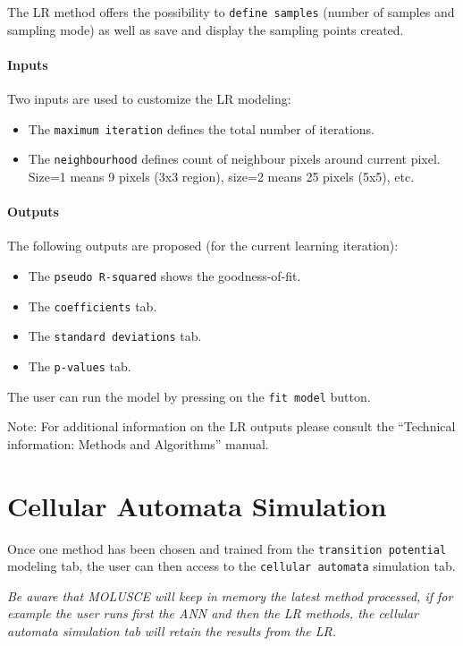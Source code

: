 \documentclass{report}
\begin{document}
The LR method offers the possibility to \verb+define samples+ (number of samples and sampling mode) as
well as save and display the sampling points created.

\paragraph{Inputs} Two inputs are used to customize the LR modeling:
\begin{itemize}
  \item The \verb+maximum iteration+ defines the total number of iterations.
  \item The \verb+neighbourhood+ defines count of neighbour pixels around current pixel. Size=1 means 9
pixels (3x3 region), size=2 means 25 pixels (5x5), etc.
\end{itemize}

\paragraph{Outputs} 

The following outputs are proposed (for the current learning iteration):

\begin{itemize}
  \item The \verb+pseudo R-squared+ shows the goodness-of-fit.
  \item The \verb+coefficients+ tab.
  \item The \verb+standard deviations+ tab.
  \item The \verb+p-values+ tab.
\end{itemize}

The user can run the model by pressing on the \verb+fit model+ button.

Note: For additional information on the LR outputs please consult the “Technical information:
Methods and Algorithms” manual.


\section{Cellular Automata Simulation}

Once one method has been chosen and trained from the \verb+transition potential+ modeling tab, 
the user can then access to the \verb+cellular automata+ simulation tab.

\emph{Be aware that MOLUSCE will keep in memory the
latest method processed, if for example the user runs first the ANN and then the LR methods, the
cellular automata simulation tab will retain the results from the LR.}
\end{document}
